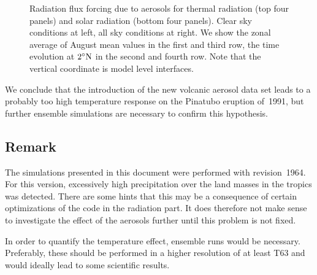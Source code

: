 \begin{appendix}
\begin{figure}
\vspace{-4cm}
\pcteight
{\vspace{-1.7cm}}
{\vspace{-1.7cm}}
{\vspace{-1.7cm}\rule{0cm}{3.3cm}}
{\vspace{-1.7cm}}
{\vspace{-1.7cm}\rule{0cm}{3.3cm}}
{\vspace{-1.7cm}}
{\rule{0cm}{3.3cm}}
{}
\caption{Radiation flux forcing due to aerosols for thermal radiation
  (top four panels) and solar radiation (bottom four panels). Clear
  sky conditions at left, all sky conditions at right. We show the
  zonal average of August mean values in the first and third row, the
  time evolution at $2^\circ{\rm N}$ in the second and fourth
  row. Note that the vertical coordinate is model level
  interfaces.}\label{figrad}  
\end{figure}

We conclude that the introduction of the new volcanic aerosol data set
leads to a probably too high temperature response on the Pinatubo
eruption of~1991, but further ensemble simulations are necessary to
confirm this hypothesis.

\subsection{Remark}

The simulations presented in this document were performed with \echam{}
revision~1964. For this version, excessively high precipitation over
the land masses in the tropics was detected. There are some hints
that this may be a consequence of certain optimizations of the code in
the radiation part. It does therefore not make sense to investigate the
effect of the aerosols further until this problem is not fixed. 

In order to quantify the temperature effect, ensemble runs would be
necessary. Preferably, these should be performed in a higher
resolution of at least T63 and would ideally lead to some scientific
results. 
\vspace{1cm}


\end{appendix}
